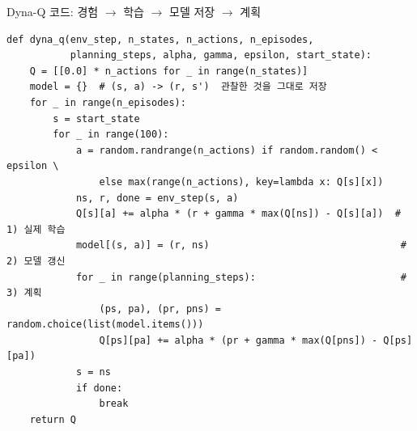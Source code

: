 \begin{frame}[fragile]{Dyna-Q 코드: 경험 $\to$ 학습 $\to$ 모델 저장 $\to$ 계획}
  \begin{lstlisting}[basicstyle=\ttfamily\scriptsize]
def dyna_q(env_step, n_states, n_actions, n_episodes,
           planning_steps, alpha, gamma, epsilon, start_state):
    Q = [[0.0] * n_actions for _ in range(n_states)]
    model = {}  # (s, a) -> (r, s')  관찰한 것을 그대로 저장
    for _ in range(n_episodes):
        s = start_state
        for _ in range(100):
            a = random.randrange(n_actions) if random.random() < epsilon \
                else max(range(n_actions), key=lambda x: Q[s][x])
            ns, r, done = env_step(s, a)
            Q[s][a] += alpha * (r + gamma * max(Q[ns]) - Q[s][a])  # 1) 실제 학습
            model[(s, a)] = (r, ns)                                 # 2) 모델 갱신
            for _ in range(planning_steps):                         # 3) 계획
                (ps, pa), (pr, pns) = random.choice(list(model.items()))
                Q[ps][pa] += alpha * (pr + gamma * max(Q[pns]) - Q[ps][pa])
            s = ns
            if done:
                break
    return Q
  \end{lstlisting}
  

\end{frame}

